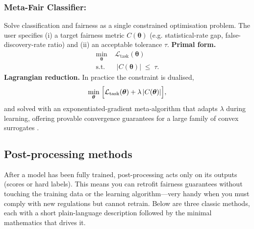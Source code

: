 \documentclass[12pt,a4paper,openright,twoside]{book}
\begin{document}
\subsubsection{Meta-Fair Classifier:} Solve classification and fairness as a single constrained optimisation problem.  The user specifies (i) a target fairness metric \begin{math}C(\boldsymbol\theta)\end{math} (e.g. statistical-rate gap, false-discovery-rate ratio) and (ii) an acceptable tolerance \begin{math}\tau\end{math}.
\textbf{Primal form.}
\begin{equation}
    \begin{aligned}
    \min_{\boldsymbol\theta}\;&\mathcal{L}_{\text{task}}(\boldsymbol\theta)\\
    \text{s.t.}\;&\;|C(\boldsymbol\theta)| \;\le\; \tau .
    \end{aligned}
\end{equation}
\textbf{Lagrangian reduction.} In practice the constraint is dualised,
\begin{equation}    
\min_{\boldsymbol\theta}\;
\Bigl[
\mathcal{L}_{\text{task}}(\boldsymbol\theta)
+\lambda\,|C(\boldsymbol\theta)|
\Bigr],
\end{equation}
and solved with an exponentiated-gradient meta-algorithm that adapts \begin{math} \lambda \end{math} during learning, offering provable convergence guarantees for a large family of convex surrogates \cite{celis2020classificationfairnessconstraintsmetaalgorithm}. 


\subsection{Post-processing methods} 
After a model has been fully trained, post-processing acts only on its outputs (scores or hard labels).
This means you can retrofit fairness guarantees without touching the training data or the learning algorithm—very handy when you must comply with new regulations but cannot retrain.
Below are three classic methods, each with a short plain-language description followed by the minimal mathematics that drives it.
\end{document}
